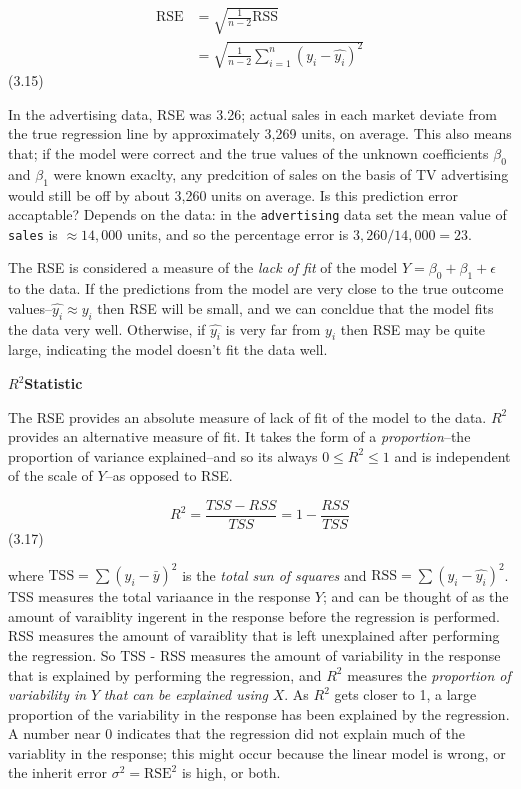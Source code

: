 \documentclass[
  letterpaper,
  DIV=11,
  numbers=noendperiod]{scrreprt}
\begin{document}
\[
\begin{align}
\text{RSE} &= \sqrt{\frac{1}{n-2}\text{RSS}} \\
&= \sqrt{\frac{1}{n-2}\sum_{i=1}^n(y_i - \hat{y_i})^2}
\end{align}
\] (3.15)

In the advertising data, RSE was 3.26; actual sales in each market
deviate from the true regression line by approximately 3,269 units, on
average. This also means that; if the model were correct and the true
values of the unknown coefficients \(\beta_0\) and \(\beta_1\) were
known exaclty, any predcition of sales on the basis of TV advertising
would still be off by about 3,260 units on average. Is this prediction
error accaptable? Depends on the data: in the \texttt{advertising} data
set the mean value of \texttt{sales} is \(\approx 14,000\) units, and so
the percentage error is \(3,260 / 14,000 = 23%
\).

The RSE is considered a measure of the \emph{lack of fit} of the model
\(Y=\beta_0 + \beta_1 + \epsilon\) to the data. If the predictions from
the model are very close to the true outcome
values--\(\hat{y_i} \approx y_i\) then RSE will be small, and we can
concldue that the model fits the data very well. Otherwise, if
\(\hat{y_i}\) is very far from \(y_i\) then RSE may be quite large,
indicating the model doesn't fit the data well.

\(R^2\)\textbf{Statistic}

The RSE provides an absolute measure of lack of fit of the model to the
data. \(R^2\) provides an alternative measure of fit. It takes the form
of a \emph{proportion}--the proportion of variance explained--and so its
always \(0\leq R^2 \leq 1\) and is independent of the scale of \(Y\)--as
opposed to RSE.

\[
R^2 = \frac{TSS - RSS}{TSS} = 1 - \frac{RSS}{TSS}
\] (3.17)

where \(\text{TSS} = \sum(y_i - \bar{y})^2\) is the \emph{total sun of
squares} and \(\text{RSS} = \sum(y_i - \hat{y_i})^2\). TSS measures the
total variaance in the response \(Y\); and can be thought of as the
amount of varaiblity ingerent in the response before the regression is
performed. RSS measures the amount of varaiblity that is left
unexplained after performing the regression. So TSS - RSS measures the
amount of variability in the response that is explained by performing
the regression, and \(R^2\) measures the \emph{proportion of variability
in} \(Y\) \emph{that can be explained using} \(X\). As \(R^2\) gets
closer to 1, a large proportion of the variability in the response has
been explained by the regression. A number near 0 indicates that the
regression did not explain much of the variablity in the response; this
might occur because the linear model is wrong, or the inherit error
\(\sigma^2 = \text{RSE}^2\) is high, or both.
\end{document}
